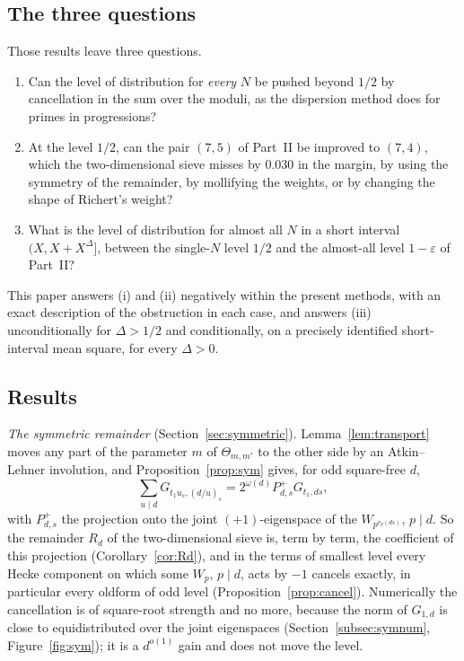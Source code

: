 \documentclass[11pt]{amsart}
\theoremstyle{remark}
\newcommand{\e}{\varepsilon}
\begin{document}
\subsection{The three questions}
Those results leave three questions.
\begin{enumerate}[label=\textup{(\roman*)},leftmargin=2.2em]
\item Can the level of distribution for \emph{every} $N$ be pushed beyond $1/2$ by cancellation in the sum over the moduli, as the dispersion method does for primes in progressions?
\item At the level $1/2$, can the pair $(7,5)$ of Part~II be improved to $(7,4)$, which the two-dimensional sieve misses by $0.030$ in the margin, by using the symmetry of the remainder, by mollifying the weights, or by changing the shape of Richert's weight?
\item What is the level of distribution for almost all $N$ in a short interval $(X,X+X^\Delta]$, between the single-$N$ level $1/2$ and the almost-all level $1-\e$ of Part~II?
\end{enumerate}
This paper answers (i) and (ii) negatively within the present methods, with an exact description of the obstruction in each case, and answers (iii) unconditionally for $\Delta>1/2$ and conditionally, on a precisely identified short-interval mean square, for every $\Delta>0$.

\subsection{Results}
\emph{The symmetric remainder} (Section~\ref{sec:symmetric}). Lemma~\ref{lem:transport} moves any part of the parameter $m$ of $\Theta_{m,m'}$ to the other side by an Atkin--Lehner involution, and Proposition~\ref{prop:sym} gives, for odd square-free $d$,
\[
\sum_{u\mid d}G_{t_1u_s,(d/u)_s}=2^{\omega(d)}P^+_{d,s}G_{t_1,ds},
\]
with $P^+_{d,s}$ the projection onto the joint $(+1)$-eigenspace of the $W_{p^{v_p(ds)}}$, $p\mid d$. So the remainder $R_d$ of the two-dimensional sieve is, term by term, the coefficient of this projection (Corollary~\ref{cor:Rd}), and in the terms of smallest level every Hecke component on which some $W_p$, $p\mid d$, acts by $-1$ cancels exactly, in particular every oldform of odd level (Proposition~\ref{prop:cancel}). Numerically the cancellation is of square-root strength and no more, because the norm of $G_{1,d}$ is close to equidistributed over the joint eigenspaces (Section~\ref{subsec:symnum}, Figure~\ref{fig:sym}); it is a $d^{o(1)}$ gain and does not move the level.
\end{document}
